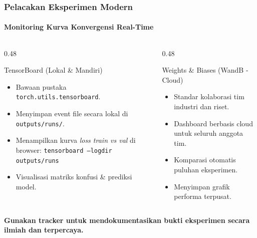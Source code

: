 \documentclass[t,aspectratio=169,xcolor=dvipsnames]{beamer}
\begin{document}
\begin{frame}
  \frametitle{Pelacakan Eksperimen Modern}
  \framesubtitle{Monitoring Kurva Konvergensi Real-Time}

  \begin{columns}[t]
    \begin{column}{0.48\textwidth}
      \begin{block}{TensorBoard (Lokal \& Mandiri)}
        \small
        \begin{itemize}\setlength{\itemsep}{2pt}
          \item Bawaan pustaka \texttt{torch.utils.tensorboard}.
          \item Menyimpan event file secara lokal di \texttt{outputs/runs/}.
          \item Menampilkan kurva \textit{loss train vs val} di browser:
          \vspace{0.05cm}
          \texttt{tensorboard --logdir outputs/runs}
          \item Visualisasi matriks konfusi \& prediksi model.
        \end{itemize}
      \end{block}
    \end{column}

    \begin{column}{0.48\textwidth}
      \begin{block}{Weights \& Biases (WandB - Cloud)}
        \small
        \begin{itemize}\setlength{\itemsep}{2pt}
          \item Standar kolaborasi tim industri dan riset.
          \item Dashboard berbasis cloud untuk seluruh anggota tim.
          \item Komparasi otomatis puluhan eksperimen.
          \item Menyimpan grafik performa terpusat.
        \end{itemize}
      \end{block}
    \end{column}
  \end{columns}

  \vspace{0.2cm}
  \centering
  \footnotesize\textbf{Gunakan tracker untuk mendokumentasikan bukti eksperimen secara ilmiah dan terpercaya.}
\end{frame}
\end{document}
